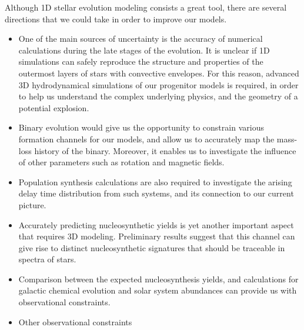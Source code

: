 \documentclass[../../main/thesis_msc.tex]{subfiles}
\begin{document}
		
		Although 1D stellar evolution modeling consists a great tool, there are several directions that we could take in order to improve our models.
		\begin{itemize}
			\item One of the main sources of uncertainty is the accuracy of numerical calculations during the late stages of the evolution. It is unclear if 1D simulations can safely reproduce the structure and properties of the outermost layers of stars with convective envelopes. For this reason, advanced 3D hydrodynamical simulations of our progenitor models is required, in order to help us understand the complex underlying physics, and the geometry of a potential explosion.
			\item Binary evolution would give us the opportunity to constrain various formation channels for our models, and allow us to accurately map the mass-loss history of the binary. Moreover, it enables us to investigate the influence of other parameters such as rotation and magnetic fields.
			\item Population synthesis calculations are also required to investigate the arising delay time distribution from such systems, and its connection to our current picture.
			\item Accurately predicting nucleosynthetic yields is yet another important aspect that requires 3D modeling. Preliminary results suggest that this channel can give rise to distinct nucleosynthetic signatures that should be traceable in spectra of stars.
			\item Comparison between the expected nucleosynthesis yields, and calculations for galactic chemical evolution and solar system abundances can provide us with observational constraints.
			\item Other observational constraints
		\end{itemize}
		

\newpage  %
\mbox{}
\thispagestyle{empty}
		
\end{document}
